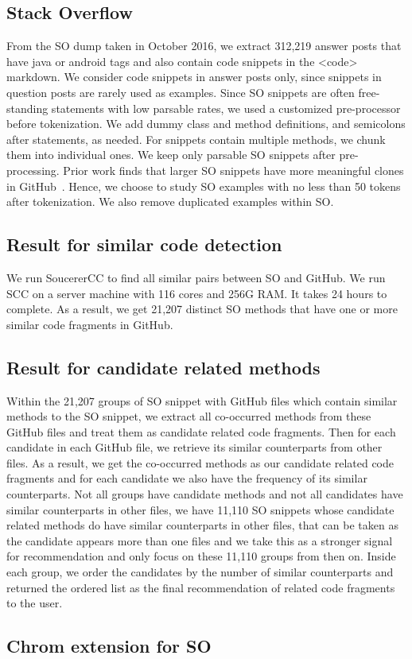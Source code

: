 \subsection{Stack Overflow}
From the SO dump taken in October 2016, we extract 312,219 answer posts that have {\ttt java} or {\ttt android} tags and also contain code snippets in the {\ttt <code>} markdown. We consider code snippets in answer posts only, since snippets in question posts are rarely used as examples. Since SO snippets are often free-standing statements with low parsable rates, we used a customized pre-processor before tokenization. We add dummy class and method definitions, and semicolons after statements, as needed. For snippets contain multiple methods, we chunk them into individual ones. We keep only parsable SO snippets after pre-processing. Prior work finds that larger SO snippets have more meaningful clones in GitHub~\cite{yang2017stack}. Hence, we choose to study SO examples with no less than 50 tokens after tokenization. We also remove duplicated examples within SO.%

\subsection{Result for similar code detection}
We run SoucererCC to find all similar pairs between SO and GitHub. We run SCC on a server machine with 116 cores and 256G RAM. It takes 24 hours to complete. As a result, we get 21,207 distinct SO methods that have one or more similar code fragments in GitHub. 


\subsection{Result for candidate related methods}
Within the 21,207 groups of SO snippet with GitHub files which contain similar methods to the SO snippet, we extract all co-occurred methods from these GitHub files and treat them as candidate related code fragments. Then for each candidate in each GitHub file, we retrieve its similar counterparts from other files. As a result, we get the co-occurred methods as our candidate related code fragments and for each candidate we also have the frequency of its similar counterparts. Not all groups have candidate methods and not all candidates have similar counterparts in other files, we have 11,110 SO snippets whose candidate related methods do have similar counterparts in other files, that can be taken as the candidate appears more than one files and we take this as a stronger signal for recommendation and only focus on these 11,110 groups from then on. Inside each group, we order the candidates by the number of similar counterparts and returned the ordered list as the final recommendation of related code fragments to the user.


\subsection{Chrom extension for SO}

